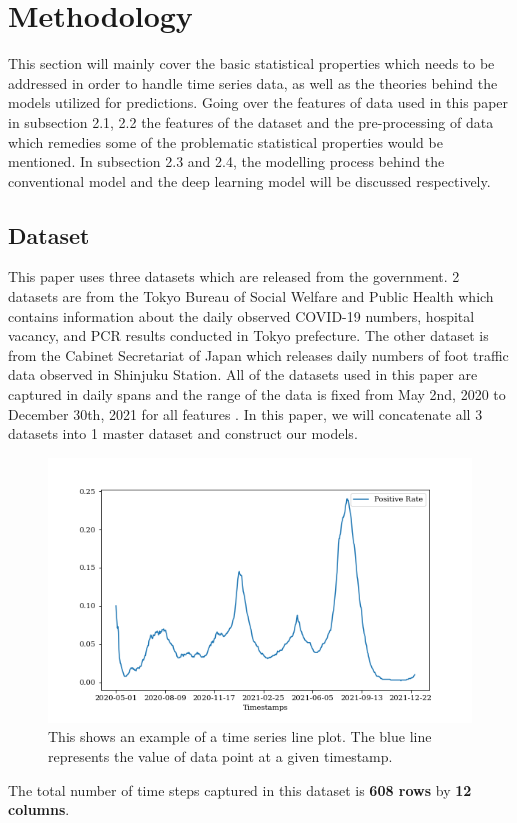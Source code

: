 \section{Methodology}
This section will mainly cover the basic statistical properties which needs to be addressed in order to handle time series data, as well as the theories behind the models utilized for predictions. Going over the features of data used in this paper in subsection 2.1, 2.2 the features of the dataset and the pre-processing of data which remedies some of the problematic statistical properties would be mentioned. In subsection 2.3 and 2.4, the modelling process behind the conventional model and the deep learning model will be discussed respectively. 

\subsection{Dataset}
This paper uses three datasets which are released from the government. 2 datasets are from the Tokyo Bureau of Social Welfare and Public Health which contains information about the daily observed COVID-19 numbers, hospital vacancy, and PCR results conducted in Tokyo prefecture. The other dataset is from the Cabinet Secretariat of Japan which releases daily numbers of foot traffic data observed in Shinjuku Station. All of the datasets used in this paper are captured in daily spans and the range of the data is fixed from May 2nd, 2020 to December 30th, 2021 for all features \citep{tokyo_COVID,tokyo_pcr, tokyo_foot_traffic}.  In this paper, we will concatenate all 3 datasets into 1 master dataset and construct our models.\\ 

\begin{figure}[!ht]
    \centering
    \includegraphics[width=12cm]{images/Positive_Rate.png}
    \caption{This shows an example of a time series line plot. The blue line represents the value of data point at a given timestamp. }
    \label{fig:lline_positive}
\end{figure}
The total number of time steps captured in this dataset is \textbf{608 rows} by \textbf{12 columns}.

